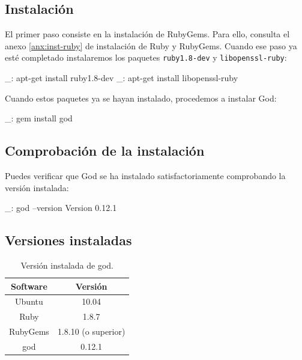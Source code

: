 \subsection{Instalación}

El primer paso consiste en la instalación de RubyGems. Para ello, consulta el anexo \ref{anx:inst-ruby} de instalación de Ruby y RubyGems. Cuando ese paso ya esté completado instalaremos los paquetes \texttt{ruby1.8-dev} y \texttt{libopenssl-ruby}:

\begin{bashcode}
_: apt-get install ruby1.8-dev
_: apt-get install libopenssl-ruby
\end{bashcode}

Cuando estos paquetes ya se hayan instalado, procedemos a instalar God:

\begin{bashcode}
_: gem install god
\end{bashcode}


\subsection{Comprobación de la instalación}

Puedes verificar que God se ha instalado satisfactoriamente comprobando la versión instalada:

\begin{bashcode}
_: god --version
Version 0.12.1
\end{bashcode}


\pagebreak
\subsection{Versiones instaladas}

\begin{table}[!htbp]
\centering
   \begin{tabular}{|c|c|}
      \hline
      \textbf{Software} & \textbf{Versión} \\ \hline
      Ubuntu & 10.04 \\ \hline
      Ruby & 1.8.7 \\ \hline
      RubyGems & 1.8.10 (o superior) \\ \hline
      god & 0.12.1 \\ \hline
   \end{tabular}
\caption{Versión instalada de god.}
\label{table:god-versions}
\end{table}
